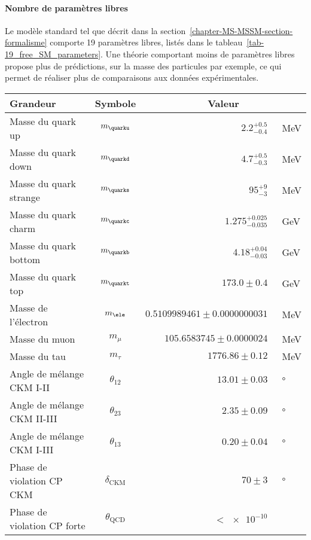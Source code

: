 \paragraph{Nombre de paramètres libres}
Le modèle standard tel que décrit dans la section~\ref{chapter-MS-MSSM-section-formalisme} comporte 19 paramètres libres, listés dans le tableau~\ref{tab-19_free_SM_parameters}.
Une théorie comportant moins de paramètres libres propose plus de prédictions, sur la masse des particules par exemple, ce qui permet de réaliser plus de comparaisons aux données expérimentales.
\begin{table}[h]
\centering
\begin{tabular}{lcrl}
\toprule
Grandeur & Symbole & \multicolumn{2}{c}{Valeur} \\
\midrule
Masse du quark up & $m_{\quarku}$ & $\num{2.2}^{+\num{0.5}}_{-\num{0.4}}$ & \SI{}{\MeV} \\
Masse du quark down & $m_{\quarkd}$ & $\num{4.7}^{+\num{0.5}}_{-\num{0.3}}$ & \SI{}{\MeV} \\
Masse du quark strange & $m_{\quarks}$ & $\num{95}^{+\num{9}}_{-\num{3}}$ & \SI{}{\MeV} \\
Masse du quark charm & $m_{\quarkc}$ & $\num{1.275}^{+\num{0.025}}_{-\num{0.035}}$ & \SI{}{\GeV} \\
Masse du quark bottom & $m_{\quarkb}$ & $\num{4.18}^{+\num{0.04}}_{-\num{0.03}}$ & \SI{}{\GeV} \\
Masse du quark top & $m_{\quarkt}$ & $\num{173.0}\pm\num{0.4}$ & \SI{}{\GeV} \\
Masse de l'électron & $m_{\ele}$ & $\num{0.5109989461}\pm\num{0.0000000031}$ & \SI{}{\MeV} \\
Masse du muon & $m_{\mu}$ & $\num{105.6583745}\pm\num{0.0000024}$ & \SI{}{\MeV} \\
Masse du tau & $m_{\tau}$ & $\num{1776.86}\pm\num{0.12}$ & \SI{}{\MeV} \\
Angle de mélange CKM I-II & $\theta_{12}$ & $\num{13.01}\pm\num{0.03}$ & \SI{}{\degree} \\
Angle de mélange CKM II-III & $\theta_{23}$ & $\num{2.35}\pm\num{0.09}$ & \SI{}{\degree} \\
Angle de mélange CKM I-III & $\theta_{13}$ & $\num{0.20}\pm\num{0.04}$ & \SI{}{\degree} \\
Phase de violation CP CKM & $\delta_{\text{CKM}}$ & $\num{70}\pm\num{3}$ & \SI{}{\degree} \\
Phase de violation CP forte & $\theta_{\text{QCD}}$ & $<\num{e-10}$ & \\

\end{tabular}
\end{table}
